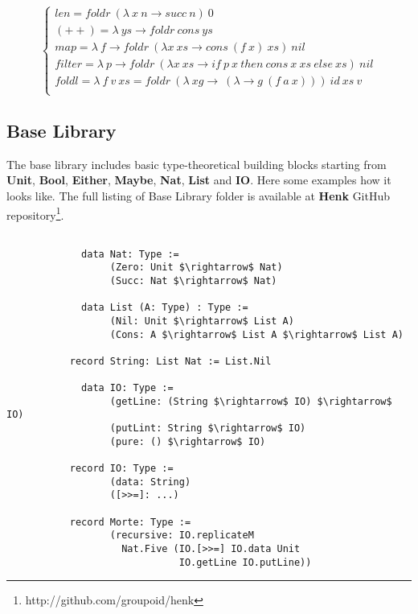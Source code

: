 \documentclass{article}
\begin{document}
$$
\begin{cases}
len = foldr\ (\lambda\ x\ n \rightarrow succ\ n)\ 0\\
(++) = \lambda\ ys \rightarrow foldr\ cons\ ys\\
map = \lambda\ f \rightarrow foldr\ (\lambda x\ xs \rightarrow cons\ (f\ x)\ xs)\ nil\\
filter = \lambda\ p \rightarrow foldr\ (\lambda x\ xs \rightarrow if\ p\ x\ then\ cons\ x\ xs\ else\ xs)\ nil\\
foldl = \lambda\ f\ v\ xs = foldr\ (\lambda\ xg\rightarrow\ (\lambda \rightarrow g\ (f\ a\ x)))\ id\ xs\ v\\
\end{cases}
$$

\subsection{Base Library}
The base library includes basic type-theoretical
building blocks starting from {\bf Unit}, {\bf Bool}, {\bf Either}, {\bf Maybe}, {\bf Nat}, {\bf List} and {\bf IO}.
Here some examples how it looks like. The full listing of Base Library folder
is available at {\bf Henk} GitHub repository\footnote{http://github.com/groupoid/henk}.

\begin{lstlisting}[mathescape=true]

             data Nat: Type :=
                  (Zero: Unit $\rightarrow$ Nat)
                  (Succ: Nat $\rightarrow$ Nat)

             data List (A: Type) : Type :=
                  (Nil: Unit $\rightarrow$ List A)
                  (Cons: A $\rightarrow$ List A $\rightarrow$ List A)

           record String: List Nat := List.Nil

             data IO: Type :=
                  (getLine: (String $\rightarrow$ IO) $\rightarrow$ IO)
                  (putLint: String $\rightarrow$ IO)
                  (pure: () $\rightarrow$ IO)

           record IO: Type :=
                  (data: String)
                  ([>>=]: ...)

           record Morte: Type :=
                  (recursive: IO.replicateM
                    Nat.Five (IO.[>>=] IO.data Unit
                              IO.getLine IO.putLine))

\end{lstlisting}
\end{document}
